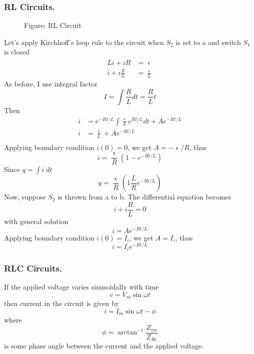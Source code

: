 \documentclass[../../../main.tex]{subfiles}
\begin{document}
\subsubsection{RL Circuits.} 
\begin{figure}[b]
    \centering
    \caption*{Figure: RL Circuit}
\end{figure}
Let’s apply Kirchhoff’s loop rule to the circuit when $S_2$ is set to a and switch $S_1$ is closed
\begin{align*}
    L\dot{i}+iR&=\upvarepsilon\\
    \dot{i}+i\frac{R}{L}&=\frac{\upvarepsilon}{L}
\end{align*}
As before, I use integral factor
\begin{equation*}
    I=\int \frac{R}{L}dt=\frac{R}{L}t
\end{equation*}
Then 
\begin{align*}
    i&=e^{-Rt/L}\int \frac{\upvarepsilon}{L}e^{Rt/L}dt+Ae^{-Rt/L}\\
    i&=\frac{\upvarepsilon}{L}+Ae^{-Rt/L}\\
\end{align*}
Applying boundary condition $i(0) = 0$, we get $A=-\upvarepsilon/R$, thus
\begin{equation*}
    i=\frac{\upvarepsilon}{R}(1-e^{-Rt/L})
\end{equation*}
Since $q= \int i\;dt$
\begin{equation*}
    q=\frac{\upvarepsilon}{R}(1\frac{L}{R}e^{-Rt/L})
\end{equation*}
Now, suppose $S_2$ is thrown from a to b. The differential equation becomes
\begin{equation*}
    \dot{i}+i\frac{R}{L}=0
\end{equation*}
with general solution
\begin{equation*}
    i=Ae^{-Rt/L}
\end{equation*}
Applying boundary condition $i(0) = I_i$, we get $A = I_i$, thus
\begin{equation*}
    i=I_ie^{-Rt/L}
\end{equation*}

\subsubsection{RLC Circuits.} If the applied voltage varies sinusoidally with time
\begin{equation*}
    v=V_m\sin \omega t
\end{equation*}
then current in the circuit is given by
\begin{equation*}
    i=I_m\sin\omega t-\phi
\end{equation*}
where
\begin{equation*}
    \phi=\arctan^{-1}\frac{Z_{im}}{Z_{Re}}
\end{equation*}
is some phase angle between the current and the applied voltage.
\end{document}
